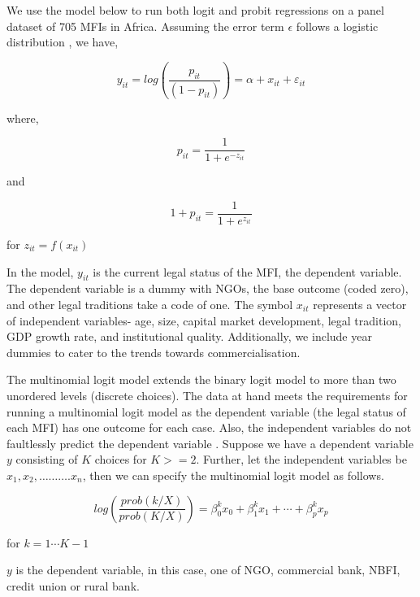 \documentclass[a4paper, nobind]{templates/ociamthesis}
\begin{document}
We use the model below to run both logit and probit regressions on a panel dataset of 705 MFIs in Africa. Assuming the error term \(\epsilon\) follows a logistic distribution \autocite{czepiel2002maximum}, we have,

\begin{equation}
y_{it} = log(\frac{p_{it}}{(1-p_{it})} ) = \alpha + x_{it} + \varepsilon_{it}
\end{equation}

where,

\begin{equation}
p_{it}  =  \frac{1}{1 +  e^{- z_{it} } } 
\end{equation}

and

\begin{equation}
1 + p_{it}  =  \frac{1}{1 +  e^{z_{it} } }
\end{equation}

for \(z_{it} = f(x_{it})\)

In the model, \(y_{it}\) is the current legal status of the MFI, the dependent variable. The dependent variable is a dummy with NGOs, the base outcome (coded zero), and other legal traditions take a code of one. The symbol \(x_{it}\) represents a vector of independent variables- age, size, capital market development, legal tradition, GDP growth rate, and institutional quality. Additionally, we include year dummies to cater to the trends towards commercialisation.

The multinomial logit model extends the binary logit model to more than two unordered levels (discrete choices). The data at hand meets the requirements for running a multinomial logit model as the dependent variable (the legal status of each MFI) has one outcome for each case. Also, the independent variables do not faultlessly predict the dependent variable \autocite{petrucci2009primer}. Suppose we have a dependent variable \(y\) consisting of \(K\) choices for \(K>=2\). Further, let the independent variables be \(x_1, x_2,………. x_n\), then we can specify the multinomial logit model as follows.

\begin{equation}
log(\frac{prob(k/X)}{prob(K/X)}) =   \beta_{0}^{k}  x_{0}  + \beta_{1}^{k}  x_{1} +  \cdots + \beta_{p}^{k}  x_{p}
\end{equation}

for \(k = 1 \cdots K-1\)

\(y\) is the dependent variable, in this case, one of NGO, commercial bank, NBFI, credit union or rural bank.
\end{document}

